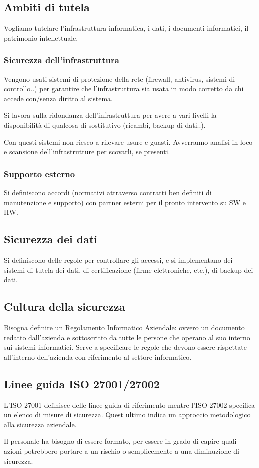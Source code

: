 \subsection{Ambiti di tutela}

Vogliamo tutelare l'infrastruttura informatica, i dati, i documenti
informatici, il patrimonio intellettuale.

\subsubsection{Sicurezza dell'infrastruttura}

Vengono usati sistemi di protezione della rete (firewall, antivirus,
sistemi di controllo..) per garantire che l'infrastruttura sia usata in
modo corretto da chi accede con/senza diritto al sistema.

Si lavora sulla ridondanza dell'infrastruttura per avere a vari livelli
la disponibilit\`a di qualcosa di sostitutivo (ricambi, backup di dati..).

Con questi sistemi non riesco a rilevare usure e guasti. Avverranno
analisi in loco e scansione dell'infrastrutture per scovarli, se
presenti.

\subsubsection{Supporto esterno}

Si definiscono accordi (normativi attraverso contratti ben definiti di
manutenzione e supporto) con partner esterni per il pronto intervento su
SW e HW.

\subsection{Sicurezza dei dati}

Si definiscono delle regole per controllare gli accessi, e si implementano dei
sistemi di tutela dei dati, di certificazione (firme elettroniche, etc.), di
backup dei dati.

\subsection{Cultura della sicurezza}

Bisogna definire un Regolamento Informatico Aziendale: ovvero un documento 
redatto dall'azienda e sottoscritto da tutte le persone che operano al suo 
interno sui sistemi informatici. Serve a specificare le regole che devono 
essere rispettate all'interno dell'azienda con riferimento al settore 
informatico.

\subsection{Linee guida ISO 27001/27002}

L'ISO 27001 definisce delle linee guida di riferimento mentre l'ISO 27002
specifica un elenco di misure di sicurezza. Quest ultimo indica un approccio 
metodologico alla sicurezza aziendale.

Il personale ha bisogno di essere formato, per essere in grado di capire quali
azioni potrebbero portare a un rischio o semplicemente a una diminuzione di 
sicurezza.


